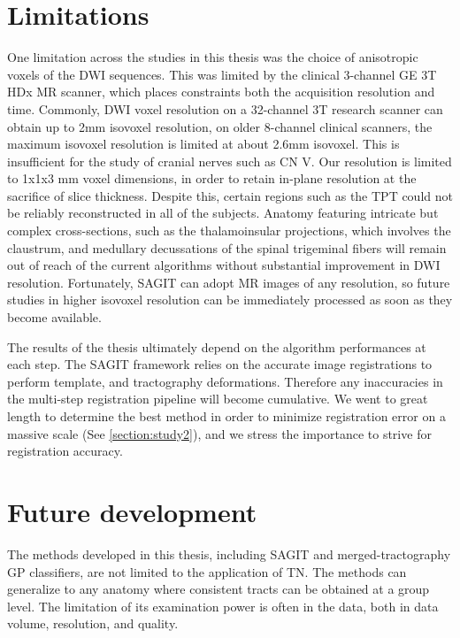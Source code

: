 \section{Limitations}

One limitation across the studies in this thesis was the choice of anisotropic voxels of the DWI sequences. This was limited by the clinical 3-channel GE 3T HDx MR scanner, which places constraints both the acquisition resolution and time. Commonly, DWI voxel resolution on a 32-channel 3T research scanner can obtain up to 2mm isovoxel resolution, on older 8-channel clinical scanners, the maximum isovoxel resolution is limited at about 2.6mm isovoxel. This is insufficient for the study of cranial nerves such as CN V. Our resolution is limited to 1x1x3 mm voxel dimensions, in order to retain in-plane resolution at the sacrifice of slice thickness. Despite this, certain regions such as the TPT could not be reliably reconstructed in all of the subjects. Anatomy featuring intricate but complex cross-sections, such as the thalamoinsular projections, which involves the claustrum, and medullary decussations of the spinal trigeminal fibers will remain out of reach of the current algorithms without substantial improvement in DWI resolution. Fortunately, SAGIT can adopt MR images of any resolution, so future studies in higher isovoxel resolution can be immediately processed as soon as they become available. 

The results of the thesis ultimately depend on the algorithm performances at each step. The SAGIT framework relies on the accurate image registrations to perform template, and tractography deformations. Therefore any inaccuracies in the multi-step registration pipeline will become cumulative. We went to great length to determine the best method in order to minimize registration error on a massive scale (See \ref{section:study2}), and we stress the importance to strive for registration accuracy. 



\section{Future development}

The methods developed in this thesis, including SAGIT and merged-tractography GP classifiers,  are not limited to the application of TN. The methods can generalize to any anatomy where consistent tracts can be obtained at a group level. The limitation of its examination power is often in the data, both in data volume, resolution, and quality. 

